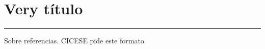
\chapter{Very título}\label{capit:cap4}
\vspace{-2.0325ex}%
\noindent
\rule{\textwidth}{0.5pt}
\vspace{-5.5ex}%
\newcommand{\pushline}{\Indp}%

Sobre referencias. CICESE pide este formato \citep{Adleman1998}


\newpage
